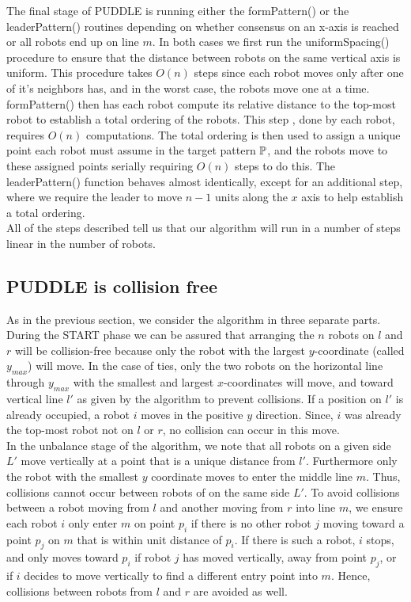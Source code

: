 \documentclass[preprint,10pt]{elsarticle}
\begin{document}
		The final stage of PUDDLE is running either the formPattern() or the leaderPattern() routines depending on
		whether consensus on an x-axis is reached or all robots end up on line $m$. In both cases we first run the 
		uniformSpacing() procedure to ensure that the distance between robots on the same vertical axis is uniform.
		This procedure takes $O(n)$ steps since each robot moves only after one of it's neighbors has, and in 
		the worst case, the robots move one at a time. formPattern() then has each robot compute its relative
		distance to the top-most robot to establish a total ordering of the robots. This step
		, done by each robot, requires $O(n)$ computations. The total ordering is then used to assign a
		unique point each robot must assume in the target pattern $\mathbb{P}$, and the robots move to these 
		assigned points serially requiring $O(n)$ steps to do this. The leaderPattern() function behaves almost
		identically, except for an additional step, where we require the leader to move $n-1$ units along the
		$x$ axis to help establish a total ordering. \\

		All of the steps described tell us that our algorithm will run in a number of steps linear in the 
		number of robots.  


		\subsection{PUDDLE is collision free} 
		As in the previous section, we consider the algorithm in three separate parts. During the START phase
		we can be assured that arranging the $n$ robots on $l$ and $r$ will be collision-free because only the
		robot with the largest $y$-coordinate (called $y_{max}$) will move. In the case of ties, only the two robots
		on the horizontal line through $y_{max}$ with the smallest and largest $x$-coordinates will move, and toward
		vertical line $l'$ as given by the algorithm to prevent collisions. 
		If a position on $l'$ is already occupied, a robot $i$
		moves in the positive $y$ direction. Since, $i$ was already the top-most robot not on $l$ or $r$, no collision
		can occur in this move. \\

		In the unbalance stage of the algorithm, we note that all robots on a given side $L'$ move vertically at a point 
		that is a unique distance from $l'$. Furthermore only the robot with the smallest $y$ coordinate
		moves to enter the middle line $m$. Thus, collisions cannot occur between robots of on the same side $L'$.
		To avoid collisions between a robot moving from $l$ and another moving from $r$ into line $m$, we ensure each
		robot $i$ only enter $m$ on point $p_i$ if there is no other robot $j$ moving toward a point $p_j$ on $m$
		that is within unit distance of $p_i$. If there is such a robot, $i$ stops, and only moves toward $p_i$ if
		robot $j$ has moved vertically, away from point $p_j$, or if $i$ decides to move vertically to find a 
		different entry point into $m$. Hence, collisions between robots from $l$ and $r$ are avoided as well. \\
\end{document}
